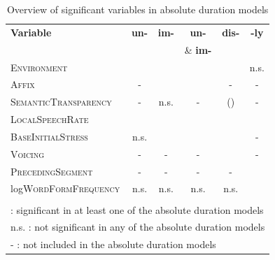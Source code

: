 \begin{table}[b!]
	\caption{Overview of significant variables in absolute duration models}
	\label{tbl: Overview of results in the corpus study}
	\centering
	\begin{center}
		\begin{tabular} {lccccc}
			
			
			\textbf{Variable} & \textbf{un-} & \textbf{im-} &\textbf{un-} &\textbf{dis-}& \textbf{-ly}\\
			& & &\& \textbf{im-}  && \\
			\hline			
			\textsc{Environment}& \checkmark & \checkmark  & \checkmark & \checkmark & n.s. \\ 
			\textsc{Affix }&- &\checkmark  & \checkmark  &- & -\\ 
			
			\textsc{SemanticTransparency}&-& n.s. &  - & (\checkmark) & - \\
			\textsc{LocalSpeechRate}&\checkmark & \checkmark & \checkmark  &\checkmark  & \checkmark \\			
			\textsc{BaseInitialStress}&n.s.& \checkmark & \checkmark & \checkmark &-\\
			\textsc{Voicing}& - & - & - &\checkmark  & - \\
			\textsc{PrecedingSegment}&-& -& - & - &\checkmark\\
			log\textsc{WordFormFrequency}&n.s.& n.s.& n.s. & n.s.&\checkmark\\
			
			\hline\\
			
			\multicolumn{6}{l}{\small \checkmark \hspace*{0.2cm}: significant in at least one of the absolute duration models} \\			
			\multicolumn{6}{l}{\small n.s. : not significant in any of the absolute duration models} \\			
			\multicolumn{6}{l}{\small - \hspace*{0.45cm}: not included in the absolute duration models} \\			
			
		\end{tabular}
	\end{center}
	
	
	\vspace*{-0.7cm}
\end{table}



